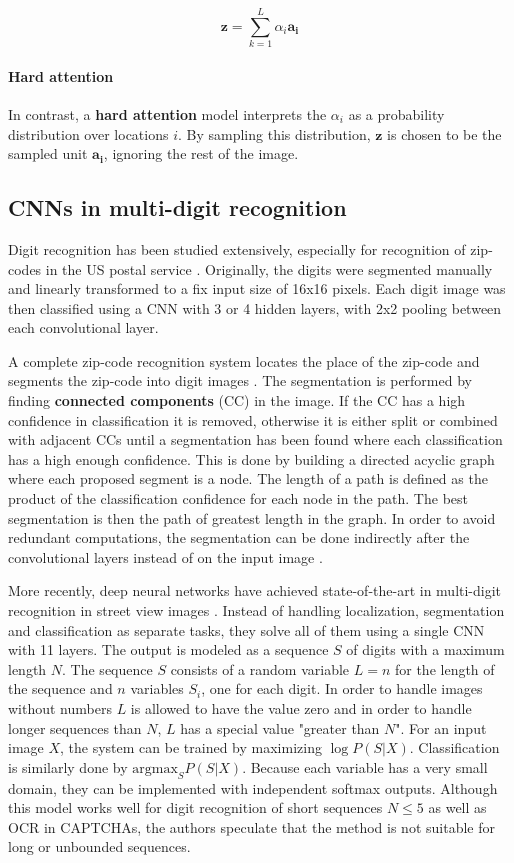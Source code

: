 \[
\mathbf{z} = \sum_{k=1}^L \alpha_i \mathbf{a_i}
\]

\paragraph{Hard attention}
In contrast, a \textbf{hard attention} model interprets the ${\alpha_i}$ as a probability distribution over locations $i$. By sampling this distribution, $\mathbf{z}$ is chosen to be the sampled unit $\mathbf{a_i}$, ignoring the rest of the image.


\subsection{CNNs in multi-digit recognition}

Digit recognition has been studied extensively, especially for recognition of zip-codes in the US postal service \cite{lecun_1989, lecun_1990}. Originally, the digits were segmented manually and linearly transformed to a fix input size of 16x16 pixels.
Each digit image was then classified using a CNN with 3 or 4 hidden layers, with 2x2 pooling between each convolutional layer.

A complete zip-code recognition system locates the place of the zip-code and segments the zip-code into digit images \cite{zipcode_system}. The segmentation is performed by finding \textbf{connected components} (CC) in the image. If the CC has a high confidence in classification it is removed, otherwise it is either split or combined with adjacent CCs until a segmentation has been found where each classification has a high enough confidence. This is done by building a directed acyclic graph where each proposed segment is a node. The length of a path is defined as the product of the classification confidence for each node in the path. The best segmentation is then the path of greatest length in the graph. In order to avoid redundant computations, the segmentation can be done indirectly after the convolutional layers instead of on the input image \cite{lecun_multidigit}.

More recently, deep neural networks have achieved state-of-the-art in multi-digit recognition in street view images \cite{multidigit_streetview}. Instead of handling localization, segmentation and classification as separate tasks, they solve all of them using a single CNN with 11 layers. The output is modeled as a sequence $S$ of digits with a maximum length $N$. The sequence $S$ consists of a random variable $L=n$ for the length of the sequence and $n$ variables $S_i$, one for each digit. In order to handle images without numbers $L$ is allowed to have the value zero and in order to handle longer sequences than $N$, $L$ has a special value "greater than $N$". For an input image $X$, the system can be trained by maximizing $\log P(S \vert X)$. Classification is similarly done by $\text{argmax}_S P(S \vert X)$.
Because each variable has a very small domain, they can be implemented with independent softmax outputs.
Although this model works well for digit recognition of short sequences $N \leq 5$ as well as OCR in CAPTCHAs, the authors speculate that the method is not suitable for long or unbounded sequences.

